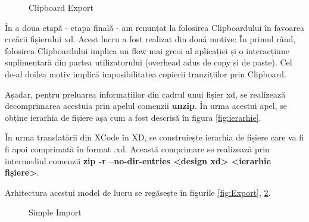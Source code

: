 \begin{figure}[!htbp]
\centering
{}
\caption{Clipboard Export} \label{fig:Clipboard Export}
\end{figure}


În a doua etapă - etapa finală - am renunțat la folosirea Clipboardului în favoarea creării fișierului xd. 
Acest lucru a fost realizat din două motive: În primul rând, folosirea Clipboardului implica un flow mai greoi al aplicației și o interacțiune suplimentară din partea utilizatorului (overhead adus de copy și de paste). Cel de-al doilea motiv implică imposibilitatea copierii tranzițiilor prin Clipboard.

Așadar, pentru preluarea informațiilor din cadrul unui fișier xd, se realizează decomprimarea acestuia prin apelul comenzii \textbf{unzip}. În urma acestui apel, se obține ierarhia de fișiere așa cum a fost descrisă în figura \ref{fig:ierarhie}.

În urma translatării din XCode în XD, se construiește ierarhia de fișiere care va fi fi apoi comprimată în format .xd. Această comprimare se realizează prin intermediul comenzii \textbf{zip -r --no-dir-entries <design xd> <ierarhie fișiere>}. 

Arhitectura acestui model de lucru se regăsește în figurile \ref{fig:Export}, \ref{fig:Import}.

\begin{figure}[!htbp]
\centering
{}
\caption{Simple Import} \label{fig:Import}
\end{figure}

